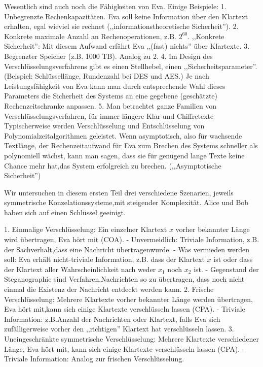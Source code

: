 \documentclass[a4paper]{article}
\begin{document}
\begin{multicols}{3}
    Wesentlich sind auch noch die Fähigkeiten von Eva. Einige Beispiele:
    1. Unbegrenzte Rechenkapazitäten. Eva soll keine Information über den Klartext erhalten, egal wieviel sie rechnet (,,informationstheoretische Sicherheit'').
    2. Konkrete maximale Anzahl an Rechenoperationen, z.B. $2^{60}$. ,,Konkrete Sicherheit'': Mit diesem Aufwand erfährt Eva ,,(fast) nichts'' über Klartexte.
    3. Begrenzter Speicher (z.B. 1000 TB). Analog zu 2.
    4. Im Design des Verschlüsselungsverfahrens gibt es einen Stellhebel, einen ,,Sicherheitsparameter''. (Beispiel: Schlüssellänge, Rundenzahl bei DES und AES.) Je nach Leistungsfähigkeit von Eva kann man durch entsprechende Wahl dieses Parameters die Sicherheit des Systems an eine gegebene (geschätzte) Rechenzeitschranke anpassen.
    5. Man betrachtet ganze Familien von Verschlüsselungsverfahren, für immer längere Klar-und Chiffretexte Typischerweise werden Verschlüsselung und Entschlüsselung von Polynomialzeitalgorithmen geleistet. Wenn asymptotisch, also für wachsende Textlänge, der Rechenzeitaufwand für Eva zum Brechen des Systems schneller als polynomiell wächst, kann man sagen, dass sie für genügend lange Texte keine Chance mehr hat,das System erfolgreich zu brechen. (,,Asymptotische Sicherheit'')

    Wir untersuchen in diesem ersten Teil drei verschiedene Szenarien, jeweils symmetrische Konzelationssysteme,mit steigender Komplexität. Alice und Bob haben sich auf einen Schlüssel geeinigt.

    1. Einmalige Verschlüsselung: Ein einzelner Klartext $x$ vorher bekannter Länge wird übertragen, Eva hört mit (COA).
    - Unvermeidlich: Triviale Information, z.B. der Sachverhalt,dass eine Nachricht übertragenwurde.
    - Was vermieden werden soll: Eva erhält nicht-triviale Information, z.B. dass der Klartext $x$ ist oder dass der Klartext aller Wahrscheinlichkeit nach weder $x_1$ noch $x_2$ ist.
    - Gegenstand der Steganographie sind Verfahren,Nachrichten so zu übertragen, dass noch nicht einmal die Existenz der Nachricht entdeckt werden kann.
    2. Frische Verschlüsselung: Mehrere Klartexte vorher bekannter Länge werden übertragen, Eva hört mit,kann sich einige Klartexte verschlüsseln lassen (CPA).
    - Triviale Information: z.B.Anzahl der Nachrichten oder Klartext, falls Eva sich zufälligerweise vorher den ,,richtigen'' Klartext hat verschlüsseln lassen.
    3. Uneingeschränkte symmetrische Verschlüsselung: Mehrere Klartexte verschiedener Länge, Eva hört mit, kann sich einige Klartexte verschlüsseln lassen (CPA).
    - Triviale Information: Analog zur frischen Verschlüsselung.


\end{multicols}
\end{document}
